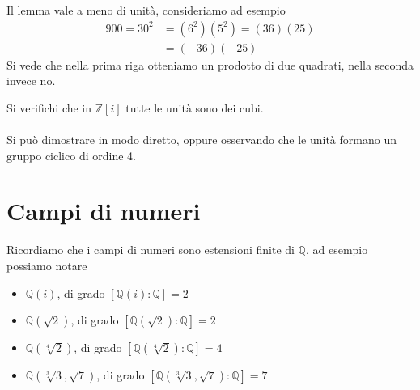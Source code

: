\begin{osservazione}
	Il lemma vale a meno di unità, consideriamo ad esempio
	\begin{align*}
	900=30^2&=(6^2)(5^2)=(36)(25)\\
	&=(-36)(-25)
	\end{align*}
	Si vede che nella prima riga otteniamo un prodotto di due quadrati, nella seconda invece no.
\end{osservazione}
\begin{esercizio}
	Si verifichi che in $\mathbb{Z}[i]$ tutte le unità sono dei cubi. \\ \\ Si può dimostrare in modo diretto, oppure osservando che le unità formano un gruppo ciclico di ordine 4.
\end{esercizio}




\section{Campi di numeri}
Ricordiamo che i campi di numeri sono estensioni finite di $\mathbb{Q}$, ad esempio possiamo notare
\begin{itemize}
	\item $\mathbb{Q}(i)$, di grado $[\mathbb{Q}(i):\mathbb{Q}]=2$
	\item $\mathbb{Q}(\sqrt{2})$, di grado $[\mathbb{Q}(\sqrt{2}):\mathbb{Q}]=2$
	\item $\mathbb{Q}(\sqrt[4]{2})$, di grado $[\mathbb{Q}(\sqrt[4]{2}):\mathbb{Q}]=4$
	\item $\mathbb{Q}(\sqrt[3]{3},\sqrt{7})$, di grado $[\mathbb{Q}(\sqrt[3]{3},\sqrt{7}):\mathbb{Q}]=7$
\end{itemize}




